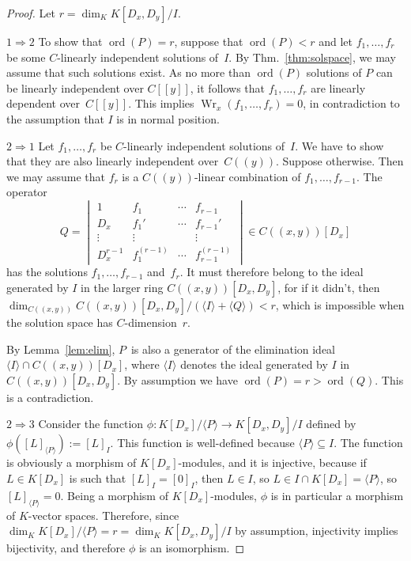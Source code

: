 \documentclass[a4paper,draft]{amsart}
\def\<#1>{\langle#1\rangle}
\def\ord{\operatorname{ord}}
\def\Wr{\operatorname{Wr}}
\begin{document}
\begin{proof}
  Let $r=\dim_K K[D_x,D_y]/I$.

  $1\Rightarrow 2$\quad
  To show that $\ord(P)=r$, suppose that $\ord(P)<r$ and let $f_1,\dots,f_r$ be
  some $C$-linearly independent solutions of~$I$. By Thm.~\ref{thm:solspace},
  we may assume that such solutions exist. 
  As no more than $\ord(P)$ solutions of $P$ can be linearly independent over
  $C[[y]]$, it follows that $f_1,\dots,f_r$ are linearly dependent over~$C[[y]]$.
  This implies $\Wr_x(f_1,\dots,f_r)=0$, in contradiction to the assumption that
  $I$ is in normal position.

  $2\Rightarrow 1$\quad
  Let $f_1,\dots,f_r$ be $C$-linearly independent solutions of~$I$.
  We have to show that they are also linearly independent over~$C((y))$.
  Suppose otherwise. Then we may assume that $f_r$ is a $C((y))$-linear combination
  of $f_1,\dots,f_{r-1}$. The operator
  \[
  Q = \begin{vmatrix}
    1 & f_1 & \cdots & f_{r-1} \\
    D_x & f_1' & \cdots & f_{r-1}' \\
    \vdots & \vdots & & \vdots \\
    D_x^{r-1} & f_1^{(r-1)} & \cdots & f_{r-1}^{(r-1)}
    \end{vmatrix} \in C((x,y))[D_x]
  \]
  has the solutions $f_1,\dots,f_{r-1}$ and~$f_r$.
  It must therefore belong to the ideal generated by $I$ in the larger ring $C((x,y))[D_x,D_y]$,
  for if it didn't, then $\dim_{C((x,y))} C((x,y))[D_x,D_y]/(\<I>+\<Q>)<r$, which
  is impossible when the solution space has $C$-dimension~$r$.

  By Lemma~\ref{lem:elim}, $P$~is also a generator of the elimination ideal
  $\<I>\cap C((x,y))[D_x]$, where $\<I>$ denotes the ideal generated by $I$
  in $C((x,y))[D_x,D_y]$. By assumption we have $\ord(P)=r>\ord(Q)$. This is
  a contradiction. 
  
  $2\Rightarrow 3$\quad
  Consider the function $\phi\colon K[D_x]/\<P>\to K[D_x,D_y]/I$ defined by
  $\phi([L]_{\<P>}):=[L]_I$.
  This function is well-defined because $\<P>\subseteq I$.
  The function is obviously a morphism of $K[D_x]$-modules, and it is injective,
  because if $L\in K[D_x]$ is such that $[L]_I=[0]_I$, then $L\in I$,
  so $L\in I\cap K[D_x]=\<P>$, so $[L]_{\<P>}=0$.
  Being a morphism of $K[D_x]$-modules, $\phi$ is in particular a morphism of $K$-vector spaces.
  Therefore, since $\dim_K K[D_x]/\<P>=r=\dim_K K[D_x,D_y]/I$ by assumption,
  injectivity implies bijectivity, and therefore $\phi$ is an isomorphism.


\end{proof}
\end{document}
